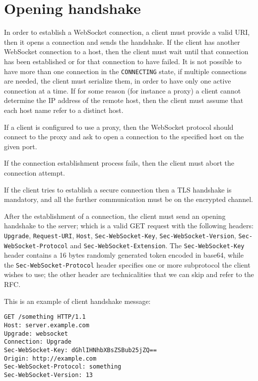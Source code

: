 \section{Opening handshake}\label{sc:open}
In order to establish a WebSocket connection, a client must provide a valid URI, then it opens a connection and sends the handshake.\newline
If the client has another WebSocket connection to a host, then the client must wait until that connection has been established or for that connection to have failed.\newline
It is not possible to have more than one connection in the \texttt{CONNECTING} state, if multiple connections are needed,
the client must serialize them, in order to have only one active connection at a time.\newline
If for some reason (for instance a proxy) a client cannot determine the IP address of the remote host,
then the client must assume that each host name refer to a distinct host.\newline

If a client is configured to use a proxy, then the WebSocket protocol should connect to the proxy and ask to open a connection to the specified host on the given port.\newline

If the connection establishment process fails, then the client must abort the connection attempt.\newline

If the client tries to establish a secure connection then a TLS handshake is mandatory, and all the further communication must be on the encrypted channel.\newline

After the establishment of a connection, the client must send an opening handshake to the server; which is a valid GET request with the following headers: \texttt{Upgrade}, \texttt{Request-URI}, \texttt{Host}, \texttt{Sec-WebSocket-Key}, \texttt{Sec-WebSocket-Version}, \texttt{Sec-WebSocket-Protocol} and \texttt{Sec-WebSocket-Extension}.\newline
The \texttt{Sec-WebSocket-Key} header contains a 16 bytes randomly generated token encoded in base64, while the \texttt{Sec-WebSocket-Protocol} header specifies one or more subprotocol the client wishes to use; the other header are technicalities that we can skip and refer to the RFC.

This is an example of client handshake message:
\begin{lstlisting}
GET /something HTTP/1.1
Host: server.example.com
Upgrade: websocket
Connection: Upgrade
Sec-WebSocket-Key: dGhlIHNhbXBsZSBub25jZQ==
Origin: http://example.com
Sec-WebSocket-Protocol: something
Sec-WebSocket-Version: 13
\end{lstlisting}

